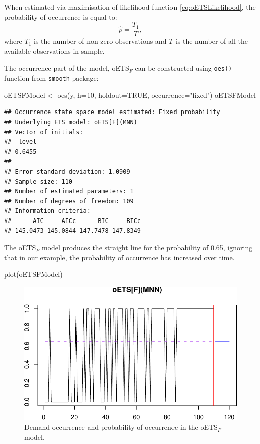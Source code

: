 \documentclass[
]{book}
\newenvironment{Shaded}{\begin{snugshade}}{\end{snugshade}}
\newcommand{\AttributeTok}[1]{\textcolor[rgb]{0.77,0.63,0.00}{#1}}
\newcommand{\ConstantTok}[1]{\textcolor[rgb]{0.00,0.00,0.00}{#1}}
\newcommand{\DecValTok}[1]{\textcolor[rgb]{0.00,0.00,0.81}{#1}}
\newcommand{\FunctionTok}[1]{\textcolor[rgb]{0.00,0.00,0.00}{#1}}
\newcommand{\NormalTok}[1]{#1}
\newcommand{\OtherTok}[1]{\textcolor[rgb]{0.56,0.35,0.01}{#1}}
\newcommand{\StringTok}[1]{\textcolor[rgb]{0.31,0.60,0.02}{#1}}
\theoremstyle{definition}
\theoremstyle{definition}
\theoremstyle{definition}
\theoremstyle{definition}
\theoremstyle{remark}
\begin{document}
When estimated via maximisation of likelihood function \eqref{eq:oETSLikelihood}, the probability of occurrence is equal to:
\begin{equation}
    \hat{p} = \frac{T_1}{T},
    \label{eq:oETSFixedProbabilityMLE}
\end{equation}
where \(T_1\) is the number of non-zero observations and \(T\) is the number of all the available observations in sample.

The occurrence part of the model, oETS\(_F\) can be constructed using \texttt{oes()} function from \texttt{smooth} package:

\begin{Shaded}
\begin{Highlighting}[]
\NormalTok{oETSFModel }\OtherTok{\textless{}{-}} \FunctionTok{oes}\NormalTok{(y, }\AttributeTok{h=}\DecValTok{10}\NormalTok{, }\AttributeTok{holdout=}\ConstantTok{TRUE}\NormalTok{,}
                   \AttributeTok{occurrence=}\StringTok{"fixed"}\NormalTok{)}
\NormalTok{oETSFModel}
\end{Highlighting}
\end{Shaded}

\begin{verbatim}
## Occurrence state space model estimated: Fixed probability
## Underlying ETS model: oETS[F](MNN)
## Vector of initials:
##  level 
## 0.6455 
## 
## Error standard deviation: 1.0909
## Sample size: 110
## Number of estimated parameters: 1
## Number of degrees of freedom: 109
## Information criteria: 
##      AIC     AICc      BIC     BICc 
## 145.0473 145.0844 147.7478 147.8349
\end{verbatim}

The oETS\(_F\) model produces the straight line for the probability of 0.65, ignoring that in our example, the probability of occurrence has increased over time.

\begin{Shaded}
\begin{Highlighting}[]
\FunctionTok{plot}\NormalTok{(oETSFModel)}
\end{Highlighting}
\end{Shaded}

\begin{figure}
\centering
\includegraphics{Svetunkov--2022----ADAM_files/figure-latex/oETSFModel-1.pdf}
\caption{\label{fig:oETSFModel}Demand occurrence and probability of occurrence in the oETS\(_F\) model.}
\end{figure}
\end{document}
